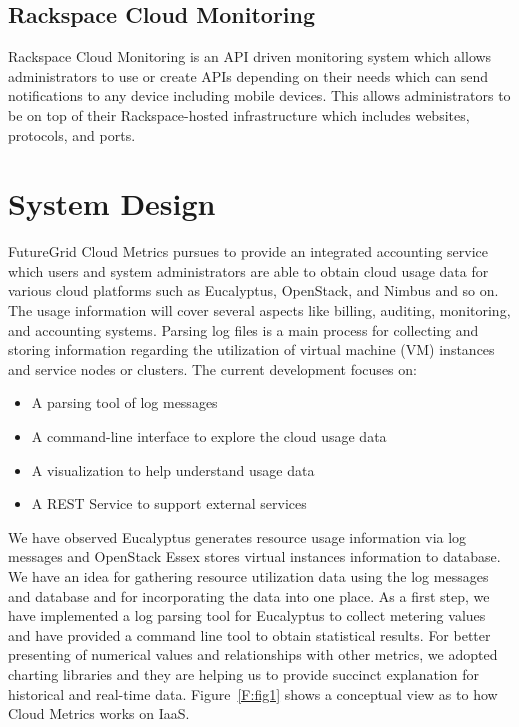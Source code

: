 \documentclass{sig-alternate}
\begin{document}
\subsection{Rackspace Cloud Monitoring}

Rackspace Cloud Monitoring is an API driven monitoring system which allows administrators to use or create APIs depending on their needs which can send notifications to any device including mobile devices. This allows administrators to be on top of their Rackspace-hosted infrastructure which includes websites, protocols, and ports.

\section{System Design} \label{S:design}

FutureGrid Cloud Metrics pursues to provide an integrated accounting service which users and system administrators are able to obtain cloud usage data for various cloud platforms such as Eucalyptus, OpenStack, and Nimbus and so on. The usage information will cover several aspects like billing, auditing, monitoring, and accounting systems. Parsing log files is a main process for collecting and storing information regarding the utilization of virtual machine (VM) instances and service nodes or clusters. The current development focuses on:

\begin{itemize}
 \item A parsing tool of log messages
 \item A command-line interface to explore the cloud usage data
 \item A visualization to help understand usage data
 \item A REST Service to support external services
\end{itemize}

We have observed Eucalyptus generates resource usage information via log messages and OpenStack Essex stores virtual instances information to database. We have an idea for gathering resource utilization data using the log messages and database and for incorporating the data into one place. As a first step, we have implemented a log parsing tool for Eucalyptus to collect metering values and have provided a command line tool to obtain statistical results. For better presenting of numerical values and relationships with other metrics, we adopted charting libraries and they are helping us to provide succinct explanation for historical and real-time data. Figure~\ref{F:fig1} shows a conceptual view as to how Cloud Metrics works on IaaS.
\end{document}
